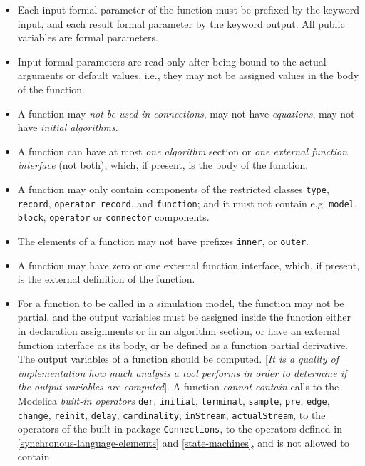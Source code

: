 \begin{itemize}
\item
  Each input formal parameter of the function must be prefixed by the
  keyword input, and each result formal parameter by the keyword output.
  All public variables are formal parameters.
\item
  Input formal parameters are read-only after being bound to the actual
  arguments or default values, i.e., they may not be assigned values in
  the body of the function.
\item
  A function may \emph{not be used in connections}, may not have
  \emph{equations}, may not have \emph{initial algorithms}.
\item
  A function can have at most \emph{one algorithm} section or \emph{one
  external function interface} (not both), which, if present, is the
  body of the function.
\item
  A function may only contain components of the restricted classes
  \lstinline!type!, \lstinline!record!, \lstinline!operator record!, and \lstinline!function!;
  and it must not contain e.g.
  \lstinline!model!, \lstinline!block!, \lstinline!operator! or \lstinline!connector!
  components.
\item
  The elements of a function may not have prefixes \lstinline!inner!, or \lstinline!outer!.
\item
  A function may have zero or one external function interface, which, if
  present, is the external definition of the function.
\item
  For a function to be called in a simulation model, the function may
  not be partial, and the output variables must be assigned inside the
  function either in declaration assignments or in an algorithm section,
  or have an external function interface as its body, or be defined as a
  function partial derivative. The output variables of a function should
  be computed. {[}\emph{It is a quality of implementation how much
  analysis a tool performs in order to determine if the output variables
  are computed}{]}. A function \emph{cannot contain} calls to the
  Modelica \emph{built-in operators} \lstinline!der!, \lstinline!initial!,
	\lstinline!terminal!, \lstinline!sample!,
  \lstinline!pre!, \lstinline!edge!, \lstinline!change!,
	\lstinline!reinit!, \lstinline!delay!, \lstinline!cardinality!,
	\lstinline!inStream!, \lstinline!actualStream!,
  to the operators of the built-in package \lstinline!Connections!, to the operators
  defined in \autoref{synchronous-language-elements} and \autoref{state-machines}, and is not allowed to contain

\end{itemize}
